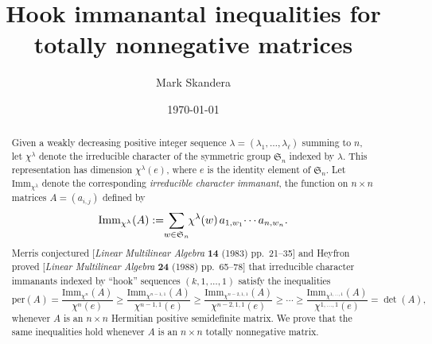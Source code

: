 \documentclass[12pt]{amsart}
\numberwithin{equation}{section}
\newcommand{\sn}{\mathfrak{S}_n}
\newcommand{\imm}[1]{\mathrm{Imm}_{#1}}
\newcommand{\defeq}{:=}
\newcommand{\ttnsp}{\hspace{.5mm}}
\newcommand{\ntnsp}{\negthinspace}
\newcommand{\ntksp}{\negthickspace}
\newcommand{\perm}{\mathrm{per}}
\newcommand{\permmon}[2]{#1_{1,#2_1} \ntnsp\cdots {#1}_{n,#2_n}}
\begin{document}
\author{Mark Skandera}

\title{Hook immanantal inequalities for totally nonnegative matrices}



\date{\today}

\begin{abstract}
  Given a weakly decreasing positive integer sequence
  $\lambda = (\lambda_1,\dotsc,\lambda_\ell)$ summing to $n$,
  let $\chi^\lambda$ denote the irreducible character
  of the symmetric group $\sn$ indexed by $\lambda$.
  This representation has dimension $\chi^\lambda(e)$,
  where $e$ is the identity element of $\sn$.
  Let $\imm{\chi^\lambda}$
  denote the corresponding
  {\em irreducible character immanant},
  the function on $n \times n$ matrices $A = (a_{i,j})$ defined by
\begin{equation*}
  \imm{\chi^\lambda}(A) \defeq \ntksp \sum_{w \in \sn} \ntksp
  \chi^\lambda(w) \ttnsp \permmon aw.
\end{equation*}
Merris conjectured [{\em Linear Multilinear Algebra} {\bf 14} (1983) pp.\ 21--35] 
and Heyfron proved [{\em Linear Multilinear Algebra} {\bf 24} (1988) pp.\ 65--78] 
that irreducible character immanants
indexed by ``hook'' sequences 
$(k, 1, \dotsc, 1)$
satisfy the inequalities
\begin{equation*}
   \perm(A)=\frac{\imm{\chi^n}(A)}{\chi^{n}(e)}\geq \frac{\imm{\chi^{n-1,1}}(A)}{\chi^{n-1,1}(e)}\geq \frac{\imm{\chi^{ n-2,1,1}}(A)}{\chi^{n-2,1,1}(e)}\geq \cdots \geq \frac{\imm{\chi^{1,\dotsc,1}}(A)}{\chi^{1,\dotsc,1}(e)}=\det(A),
\end{equation*} 
whenever $A$ is an $n \times n$ Hermitian positive semidefinite matrix.
We prove that the same inequalities hold
whenever $A$ is an $n \times n$ totally nonnegative matrix.
\end{abstract}

  
\maketitle
\end{document}
